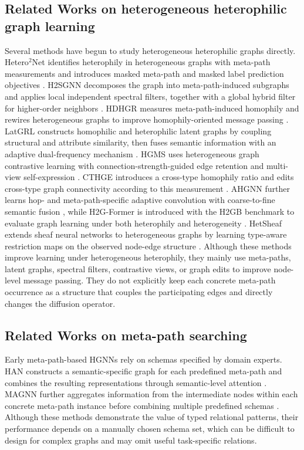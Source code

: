 \subsection{Related Works on heterogeneous heterophilic graph learning}
Several methods have begun to study heterogeneous heterophilic graphs directly. 
Hetero$^2$Net identifies heterophily in heterogeneous graphs with meta-path measurements and introduces masked meta-path and masked label prediction objectives \cite{li2025hetero2net}. 
H2SGNN decomposes the graph into meta-path-induced subgraphs and applies local independent spectral filters, together with a global hybrid filter for higher-order neighbors \cite{lu2026addressing}. 
HDHGR measures meta-path-induced homophily and rewires heterogeneous graphs to improve homophily-oriented message passing \cite{guo2023homophily}. 
LatGRL constructs homophilic and heterophilic latent graphs by coupling structural and attribute similarity, then fuses semantic information with an adaptive dual-frequency mechanism \cite{shen2025heterophily}. 
HGMS uses heterogeneous graph contrastive learning with connection-strength-guided edge retention and multi-view self-expression \cite{wang2025homophily}. 
CTHGE introduces a cross-type homophily ratio and edits cross-type graph connectivity according to this measurement \cite{tao2025cthge}. 
AHGNN further learns hop- and meta-path-specific adaptive convolution with coarse-to-fine semantic fusion \cite{chen2025adaptive}, while H2G-Former is introduced with the H2GB benchmark to evaluate graph learning under both heterophily and heterogeneity \cite{lin2025heterophily}. 
HetSheaf extends sheaf neural networks to heterogeneous graphs by learning type-aware restriction maps on the observed node-edge structure \cite{braithwaite2024heterogeneous}.
Although these methods improve learning under heterogeneous heterophily, they mainly use meta-paths, latent graphs, spectral filters, contrastive views, or graph edits to improve node-level message passing. 
They do not explicitly keep each concrete meta-path occurrence as a structure that couples the participating edges and directly changes the diffusion operator.
\subsection{Related Works on meta-path searching}

Early meta-path-based HGNNs rely on schemas specified by domain experts. HAN constructs a
semantic-specific graph for each predefined meta-path and combines the resulting representations
through semantic-level attention \cite{wang2019han}. MAGNN further aggregates information from the
intermediate nodes within each concrete meta-path instance before combining multiple predefined
schemas \cite{fu2020magnn}. Although these methods demonstrate the value of typed relational
patterns, their performance depends on a manually chosen schema set, which can be difficult to
design for complex graphs and may omit useful task-specific relations.

